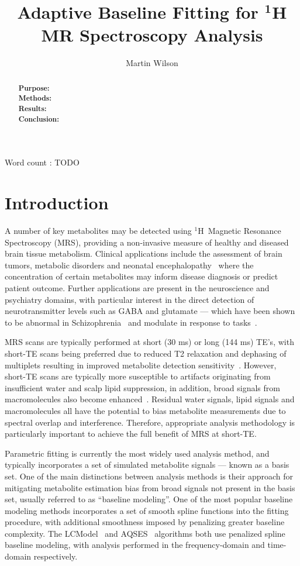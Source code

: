 \documentclass[num-refs]{wiley-article}
\title{Adaptive Baseline Fitting for $^{\textbf{1}}$H MR Spectroscopy Analysis}
\author[1]{Martin Wilson}
\affil[1]{Centre for Human Brain Health and School of Psychology, University of Birmingham, Birmingham, UK.}
\newcommand{\proton}{\ensuremath{^1\mathrm{H}}}
\begin{document}
\maketitle

\begin{abstract}
\textbf{Purpose:} \\
\textbf{Methods:} \\
\textbf{Results:} \\
\textbf{Conclusion:} 
\end{abstract}

Word count : TODO


\section{Introduction}
A number of key metabolites may be detected using \proton\ Magnetic Resonance Spectroscopy (MRS), providing a non-invasive measure of healthy and diseased brain tissue metabolism. Clinical applications include the assessment of brain tumors, metabolic disorders and neonatal encephalopathy~\cite{Oz2014,Lally2019} where the concentration of certain metabolites may inform disease diagnosis or predict patient outcome. Further applications are present in the neuroscience and psychiatry domains, with particular interest in the direct detection of neurotransmitter levels such as GABA and glutamate --- which have been shown to be abnormal in Schizophrenia~\cite{Merritt2016} and modulate in response to tasks~\cite{Jelen2018,Chen2017}.

MRS scans are typically performed at short (30 ms) or long (144 ms) TE's, with short-TE scans being preferred due to reduced T2 relaxation and dephasing of multiplets resulting in improved metabolite detection sensitivity~\cite{Wilson2019}. However, short-TE scans are typically more susceptible to artifacts originating from insufficient water and scalp lipid suppression, in addition, broad signals from macromolecules also become enhanced~\cite{Cudalbu2012}. Residual water signals, lipid signals and macromolecules all have the potential to bias metabolite measurements due to spectral overlap and interference. Therefore, appropriate analysis methodology is particularly important to achieve the full benefit of MRS at short-TE.

Parametric fitting is currently the most widely used analysis method, and typically incorporates a set of simulated metabolite signals --- known as a basis set. One of the main distinctions between analysis methods is their approach for mitigating metabolite estimation bias from broad signals not present in the basis set, usually referred to as ``baseline modeling''. One of the most popular baseline modeling methods incorporates a set of smooth spline functions into the fitting procedure, with additional smoothness imposed by penalizing greater baseline complexity. The LCModel~\cite{Provencher1993} and AQSES~\cite{Poullet2007} algorithms both use penalized spline baseline modeling, with analysis performed in the frequency-domain and time-domain respectively.
\end{document}
